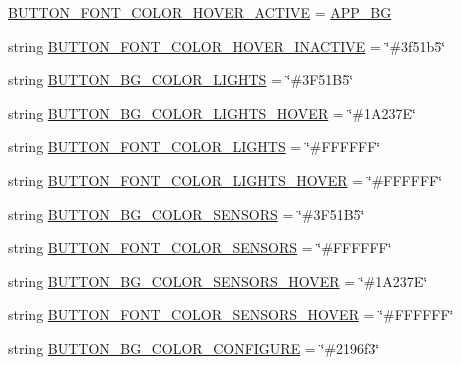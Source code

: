 \begin{DoxyCompactItemize}
\hyperlink{namespaceDesignColors_a560437dc7a8bb2c6f96ba9e42e01e6df}{B\+U\+T\+T\+O\+N\+\_\+\+F\+O\+N\+T\+\_\+\+C\+O\+L\+O\+R\+\_\+\+H\+O\+V\+E\+R\+\_\+\+A\+C\+T\+I\+VE} = \hyperlink{namespaceDesignColors_a78a48ceae30092b74429c7b1fd3511b5}{A\+P\+P\+\_\+\+BG}
\item 
string \hyperlink{namespaceDesignColors_a61ad2f84b5395e78bb044a651eae513a}{B\+U\+T\+T\+O\+N\+\_\+\+F\+O\+N\+T\+\_\+\+C\+O\+L\+O\+R\+\_\+\+H\+O\+V\+E\+R\+\_\+\+I\+N\+A\+C\+T\+I\+VE} = \char`\"{}\#3f51b5\char`\"{}
\item 
string \hyperlink{namespaceDesignColors_a70532505329fa9871cb99db52738b54c}{B\+U\+T\+T\+O\+N\+\_\+\+B\+G\+\_\+\+C\+O\+L\+O\+R\+\_\+\+L\+I\+G\+H\+TS} = \char`\"{}\#3\+F51\+B5\char`\"{}
\item 
string \hyperlink{namespaceDesignColors_a8a4e371d50ada0c193a5afee4da7ed8f}{B\+U\+T\+T\+O\+N\+\_\+\+B\+G\+\_\+\+C\+O\+L\+O\+R\+\_\+\+L\+I\+G\+H\+T\+S\+\_\+\+H\+O\+V\+ER} = \char`\"{}\#1\+A237\+E\char`\"{}
\item 
string \hyperlink{namespaceDesignColors_a9bcef4aac1668aa15a8cf4d2e3cdd950}{B\+U\+T\+T\+O\+N\+\_\+\+F\+O\+N\+T\+\_\+\+C\+O\+L\+O\+R\+\_\+\+L\+I\+G\+H\+TS} = \char`\"{}\#F\+F\+F\+F\+FF\char`\"{}
\item 
string \hyperlink{namespaceDesignColors_a79be88ee28771eef3075c3b71f914fde}{B\+U\+T\+T\+O\+N\+\_\+\+F\+O\+N\+T\+\_\+\+C\+O\+L\+O\+R\+\_\+\+L\+I\+G\+H\+T\+S\+\_\+\+H\+O\+V\+ER} = \char`\"{}\#F\+F\+F\+F\+FF\char`\"{}
\item 
string \hyperlink{namespaceDesignColors_a1755e521f53c725530392505a1082a6e}{B\+U\+T\+T\+O\+N\+\_\+\+B\+G\+\_\+\+C\+O\+L\+O\+R\+\_\+\+S\+E\+N\+S\+O\+RS} = \char`\"{}\#3\+F51\+B5\char`\"{}
\item 
string \hyperlink{namespaceDesignColors_ad37f409a4c81842f5d33936d0de67ce9}{B\+U\+T\+T\+O\+N\+\_\+\+F\+O\+N\+T\+\_\+\+C\+O\+L\+O\+R\+\_\+\+S\+E\+N\+S\+O\+RS} = \char`\"{}\#F\+F\+F\+F\+FF\char`\"{}
\item 
string \hyperlink{namespaceDesignColors_a4ca06c3cc79b8d4f53637799a95a40f0}{B\+U\+T\+T\+O\+N\+\_\+\+B\+G\+\_\+\+C\+O\+L\+O\+R\+\_\+\+S\+E\+N\+S\+O\+R\+S\+\_\+\+H\+O\+V\+ER} = \char`\"{}\#1\+A237\+E\char`\"{}
\item 
string \hyperlink{namespaceDesignColors_a807babc40404f8ab760df5a32277b8a1}{B\+U\+T\+T\+O\+N\+\_\+\+F\+O\+N\+T\+\_\+\+C\+O\+L\+O\+R\+\_\+\+S\+E\+N\+S\+O\+R\+S\+\_\+\+H\+O\+V\+ER} = \char`\"{}\#F\+F\+F\+F\+FF\char`\"{}
\item 
string \hyperlink{namespaceDesignColors_a33569d0643d312e2282ef327f0179339}{B\+U\+T\+T\+O\+N\+\_\+\+B\+G\+\_\+\+C\+O\+L\+O\+R\+\_\+\+C\+O\+N\+F\+I\+G\+U\+RE} = \char`\"{}\#2196f3\char`\"{}

\end{DoxyCompactItemize}
